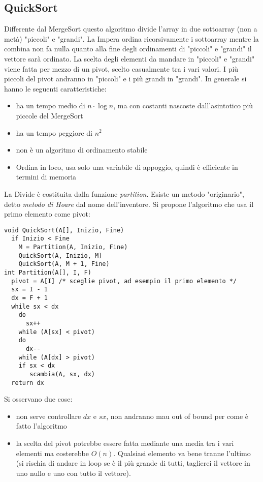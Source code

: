 \documentclass[a4paper,12pt,oneside,tikz]{book}
\begin{document}
\subsection{QuickSort}
Differente dal MergeSort questo algoritmo divide l'array in due sottoarray (non a metà) "piccoli" e "grandi". La Impera ordina ricorsivamente i sottoarray mentre la combina non fa nulla quanto alla fine degli ordinamenti di "piccoli" e "grandi" il vettore sarà ordinato. La scelta degli elementi da mandare in "piccoli" e "grandi" viene fatta per mezzo di un pivot, scelto casualmente tra i vari valori. I più piccoli del pivot andranno in "piccoli" e i più grandi in "grandi". In generale si hanno le seguenti caratteristiche:
\begin{itemize}
\item ha un tempo medio di $n\cdot\log n$, ma con costanti nascoste dall'asintotico più piccole del MergeSort
\item ha un tempo peggiore di $n^2$
\item non è un algoritmo di ordinamento stabile
\item Ordina in loco, usa solo una variabile di appoggio, quindi è efficiente in termini di memoria
\end{itemize}
La Divide è costituita dalla funzione \textit{partition}. Esiste un metodo "originario", detto \textit{metodo di Hoare} dal nome dell'inventore.
Si propone l'algoritmo che usa il primo elemento come pivot:
\begin{verbatim}
void QuickSort(A[], Inizio, Fine)
  if Inizio < Fine
    M = Partition(A, Inizio, Fine)
    QuickSort(A, Inizio, M)
    QuickSort(A, M + 1, Fine)
int Partition(A[], I, F)
  pivot = A[I] /* sceglie pivot, ad esempio il primo elemento */
  sx = I - 1
  dx = F + 1
  while sx < dx
    do
      sx++
    while (A[sx] < pivot)
    do
      dx--
    while (A[dx] > pivot)
    if sx < dx
       scambia(A, sx, dx)
  return dx
\end{verbatim}
\newpage
Si osservano due cose:
\begin{itemize}
\item non serve controllare $dx$ e $sx$, non andranno mau out of bound per come è fatto l'algoritmo
\item la scelta del pivot potrebbe essere fatta mediante una media tra i vari elementi ma costerebbe $O(n)$. Qualsiasi elemento va bene tranne l'ultimo (si rischia di andare in loop se è il più grande di tutti, taglierei il vettore in uno nullo e uno con tutto il vettore).
\end{itemize}
\end{document}
